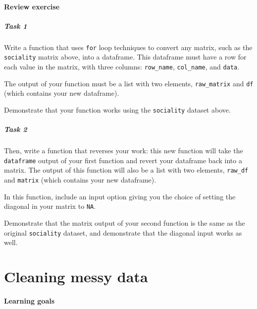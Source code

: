 \documentclass[
]{book}
\begin{document}
\hypertarget{review-exercise-5}{%
\subsubsection*{Review exercise}\label{review-exercise-5}}

\hypertarget{task-1-2}{%
\paragraph{Task 1}\label{task-1-2}}

Write a function that uses \texttt{for} loop techniques to convert any matrix, such as the \texttt{sociality} matrix above, into a dataframe. This dataframe must have a row for each value in the matrix, with three columns: \texttt{row\_name}, \texttt{col\_name}, and \texttt{data}.

The output of your function must be a list with two elements, \texttt{raw\_matrix} and \texttt{df} (which contains your new dataframe).

Demonstrate that your function works using the \texttt{sociality} dataset above.

\hypertarget{task-2-2}{%
\paragraph{Task 2}\label{task-2-2}}

Then, write a function that reverses your work: this new function will take the \texttt{dataframe} output of your first function and revert your dataframe back into a matrix. The output of this function will also be a list with two elements, \texttt{raw\_df} and \texttt{matrix} (which contains your new dataframe).

In this function, include an input option giving you the choice of setting the diagonal in your matrix to \texttt{NA}.

Demonstrate that the matrix output of your second function is the same as the original \texttt{sociality} dataset, and demonstrate that the diagonal input works as well.

\hypertarget{cleaning-messy-data}{%
\chapter{Cleaning messy data}\label{cleaning-messy-data}}

\hypertarget{learning-goals-19}{%
\subsubsection*{Learning goals}\label{learning-goals-19}}
\end{document}

